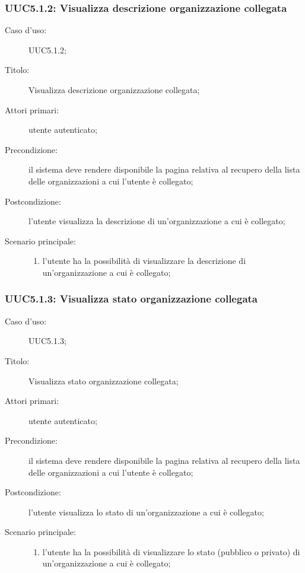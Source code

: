 \documentclass[../../../analisi-dei-requisiti.tex]{subfiles}
\begin{document}
\subsubsection{UUC5.1.2: Visualizza descrizione organizzazione collegata}%
\label{subs:UUC5.1.2}
\begin{description}
  \item[Caso d'uso:] UUC5.1.2;
  \item[Titolo:] Visualizza descrizione organizzazione collegata;
  \item[Attori primari:] utente autenticato;
  \item[Precondizione:] il sistema deve rendere disponibile la pagina relativa al recupero della lista delle organizzazioni a cui l'utente è collegato;
  \item[Postcondizione:] l'utente visualizza la descrizione di un'organizzazione a cui è collegato;
  \item[Scenario principale:]
        \begin{enumerate}
          \item l'utente ha la possibilità di visualizzare la descrizione di un'organizzazione a cui è collegato;
        \end{enumerate}
\end{description}

\subsubsection{UUC5.1.3: Visualizza stato organizzazione collegata}%
\label{subs:UUC5.1.3}
\begin{description}
  \item[Caso d'uso:] UUC5.1.3;
  \item[Titolo:] Visualizza stato organizzazione collegata;
  \item[Attori primari:] utente autenticato;
  \item[Precondizione:] il sistema deve rendere disponibile la pagina relativa al recupero della lista delle organizzazioni a cui l'utente è collegato;
  \item[Postcondizione:] l'utente visualizza lo stato di un'organizzazione a cui è collegato;
  \item[Scenario principale:]
        \begin{enumerate}
          \item l'utente ha la possibilità di visualizzare lo stato (pubblico o privato) di un'organizzazione a cui è collegato;
        \end{enumerate}
\end{description}
\end{document}

